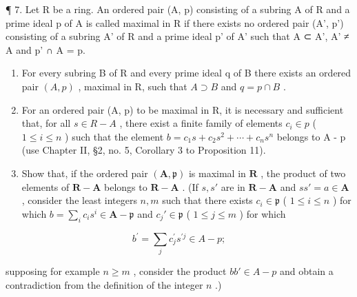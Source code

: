 ¶ 7. Let R be a ring. An ordered pair (A, p) consisting of a subring A of R and a prime ideal p of A is called maximal in R if there exists no ordered pair (A', p') consisting of a subring A' of R and a prime ideal p' of A' such that A ⊂ A', A' ≠ A and p' ∩ A = p.

\begin{enumerate}
\def\labelenumi{(\alph{enumi})}
\item
  For every subring B of R and every prime ideal q of B there exists an ordered pair \((A, p)\) , maximal in R, such that \(A \supset B\) and \(q = p \cap B\) .
\item
  For an ordered pair (A, p) to be maximal in R, it is necessary and sufficient that, for all \(s \in R - A\) , there exist a finite family of elements \(c_{i} \in p\) ( \(1 \leqslant i \leqslant n\) ) such that the element \(b = c_{1}s + c_{2}s^{2} + \cdots + c_{n}s^{n}\) belongs to A - p (use Chapter II, §2, no. 5, Corollary 3 to Proposition 11).
\item
  Show that, if the ordered pair \((\mathbf{A},\mathfrak{p})\) is maximal in \(\mathbf{R}\) , the product of two elements of \(\mathbf{R} - \mathbf{A}\) belongs to \(\mathbf{R} - \mathbf{A}\) . (If \(s,s'\) are in \(\mathbf{R} - \mathbf{A}\) and \(ss' = a\in \mathbf{A}\) , consider the least integers \(n,m\) such that there exists \(c_{i}\in \mathfrak{p}\) ( \(1\leqslant i\leqslant n\) ) for which \(b = \sum_{i}c_{i}s^{i}\in \mathbf{A} - \mathfrak{p}\) and \(c_{j}'\in \mathfrak{p}\) ( \(1\leqslant j\leqslant m\) ) for which
\end{enumerate}

\[
b ^ {\prime} = \sum_ {j} c _ {j} ^ {\prime} s ^ {\prime j} \in A - p;
\]

supposing for example \(n \geqslant m\) , consider the product \(bb' \in A - p\) and obtain a contradiction from the definition of the integer \(n\) .)

